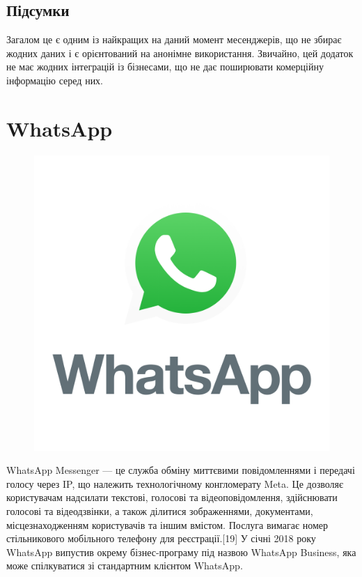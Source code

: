 \subsection{Підсумки}

Загалом це є одним із найкращих на даний момент месенджерів, що не збирає жодних даних і є орієнтований на анонімне використання. Звичайно, цей додаток не має жодних інтеграцій із бізнесами, що не дає поширювати комерційну інформацію серед них. 

\section{WhatsApp}

\begin{figure}
    \includegraphics[width=0.9\linewidth]{../IMAGES/whatsapp.png} 
    \label{fig:whatsapp}
\end{figure}

WhatsApp Messenger — це служба обміну миттєвими повідомленнями і передачі голосу через IP, що належить технологічному конгломерату Meta. Це дозволяє користувачам надсилати текстові, голосові та відеоповідомлення, здійснювати голосові та відеодзвінки, а також ділитися зображеннями, документами, місцезнаходженням користувачів та іншим вмістом. Послуга вимагає номер стільникового мобільного телефону для реєстрації.[19] У січні 2018 року WhatsApp випустив окрему бізнес-програму під назвою WhatsApp Business, яка може спілкуватися зі стандартним клієнтом WhatsApp.

